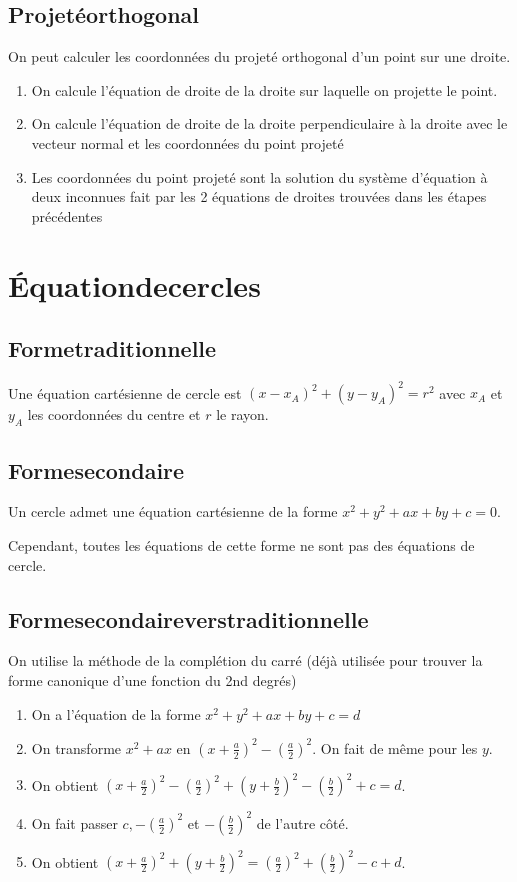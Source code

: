 \documentclass[a4paper,twoside,10pt,french,twocolumn]{scrartcl}
\begin{document}
\subsection{Projeté\:orthogonal}
On peut calculer les coordonnées du projeté orthogonal d'un point sur une droite.
\begin{enumerate}
\item On calcule l'équation de droite de la droite sur laquelle on projette le point.
\item On calcule l'équation de droite de la droite perpendiculaire à la droite avec le vecteur normal et les coordonnées du point projeté
\item Les coordonnées du point projeté sont la solution du système d'équation à deux inconnues fait par les 2 équations de droites trouvées dans les étapes précédentes
\end{enumerate}
\section{Équation\:de\:cercles}
\subsection{Forme\:traditionnelle}
Une équation cartésienne de cercle est $ (x-x_A)^2 + (y-y_A)^2 = r^2$ avec $x_A$ et $y_A$ les coordonnées du centre et $r$ le rayon.
\subsection{Forme\:secondaire}
Un cercle admet une équation cartésienne de la forme $x^2+y^2+ax+by+c = 0$.

Cependant, toutes les équations de cette forme ne sont pas des équations de cercle.
\subsection{Forme\:secondaire\:vers\:traditionnelle}
On utilise la méthode de la complétion du carré (déjà utilisée pour trouver la forme canonique d'une fonction du 2nd degrés)
\begin{enumerate}
 \item On a l'équation de la forme $x^2+y^2 +ax+by+c = d$
 \item On transforme $x^2 + ax$ en $ (x + \frac{a}{2})^2 - (\frac{a}{2})^2$. On fait de même pour les $y$.
 \item On obtient $(x + \frac{a}{2})^2 - (\frac{a}{2})^2 + (y + \frac{b}{2})^2 - (\frac{b}{2})^2 + c =d$.
 \item On fait passer $c, -(\frac{a}{2})^2$ et $-(\frac{b}{2})^2$ de l'autre côté.
 \item On obtient $(x + \frac{a}{2})^2 + (y + \frac{b}{2})^2 = (\frac{a}{2})^2 + (\frac{b}{2})^2 - c + d$.
\end{enumerate}
\end{document}
